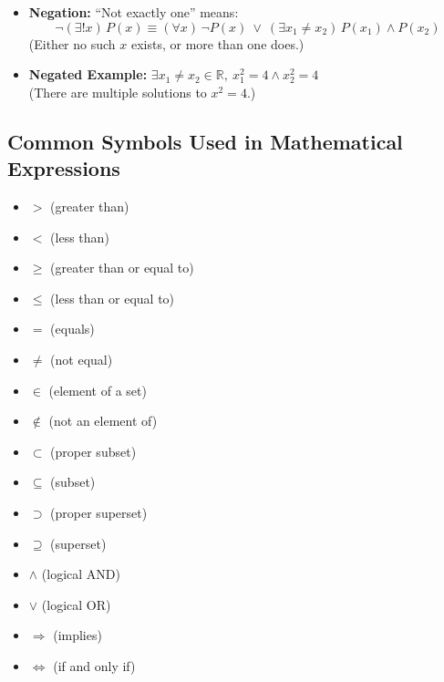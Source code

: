 \begin{description}[leftmargin=1.5cm, labelindent=1cm, style=sameline]
\begin{itemize}
    \item \textbf{Negation:} \quad ``Not exactly one'' means:
    \[
    \neg (\exists! x)\, P(x) \equiv (\forall x)\, \neg P(x)\ \lor\ (\exists x_1 \neq x_2)\, P(x_1) \land P(x_2)
    \]
    (Either no such \( x \) exists, or more than one does.)

    \item \textbf{Negated Example:} \quad $\exists x_1 \neq x_2 \in \mathbb{R},\ x_1^2 = 4 \land x_2^2 = 4$ \\
    (There are multiple solutions to \( x^2 = 4 \).)
\end{itemize}

\end{description}

\subsection{Common Symbols Used in Mathematical Expressions}
\begin{itemize}
    \item $>$ \quad (greater than) \\
    \item $<$ \quad (less than) \\
    \item $\geq$ \quad (greater than or equal to) \\
    \item $\leq$ \quad (less than or equal to) \\
    \item $=$ \quad (equals) \\
    \item $\neq$ \quad (not equal) \\
    \item $\in$ \quad (element of a set) \\
    \item $\notin$ \quad (not an element of) \\
    \item $\subset$ \quad (proper subset) \\
    \item $\subseteq$ \quad (subset) \\
    \item $\supset$ \quad (proper superset) \\
    \item $\supseteq$ \quad (superset) \\
    \item $\land$ \quad (logical AND) \\
    \item $\lor$ \quad (logical OR) \\
    \item $\Rightarrow$ \quad (implies) \\
    \item $\Leftrightarrow$ \quad (if and only if)
\end{itemize}

\newpage